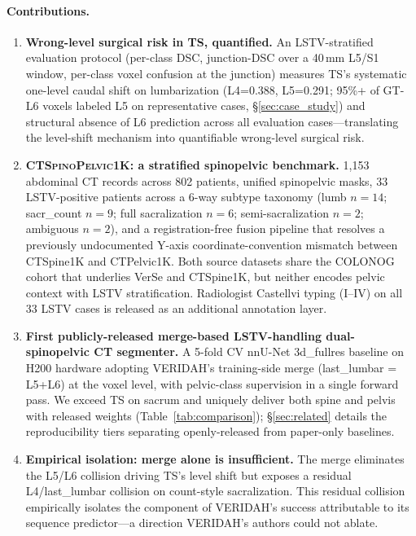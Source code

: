 \documentclass{article}
\newcommand{\dataset}{\textsc{CTSpinoPelvic1K}}
\newcommand{\sota}{TS}
\newcommand{\VERIDAH}{VERIDAH}
\newcommand{\VerSe}{VerSe}
\begin{document}
\paragraph{Contributions.}
\begin{enumerate}
\item[(i)] \textbf{Wrong-level surgical risk in \sota{},
  quantified.} An LSTV-stratified evaluation protocol
  (per-class DSC, junction-DSC over a 40\,mm L5/S1
  window, per-class voxel confusion at the junction)
  measures \sota{}'s systematic one-level caudal shift
  on lumbarization (L4=0.388, L5=0.291; 95\%+ of GT-L6
  voxels labeled L5 on representative cases,
  \S\ref{sec:case_study}) and structural absence of L6
  prediction across all evaluation cases---translating
  the level-shift mechanism into quantifiable
  wrong-level surgical risk.
\item[(ii)] \textbf{\dataset{}: a stratified spinopelvic
  benchmark.} 1{,}153 abdominal CT records across 802
  patients, unified spinopelvic masks, 33 LSTV-positive
  patients across a 6-way subtype taxonomy
  (lumb $n=14$; sacr\_count $n=9$; full sacralization
  $n=6$; semi-sacralization $n=2$; ambiguous $n=2$), and a
  registration-free fusion pipeline that resolves a
  previously undocumented Y-axis coordinate-convention
  mismatch between CTSpine1K and CTPelvic1K. Both source
  datasets share the COLONOG cohort that underlies
  \VerSe{} and CTSpine1K, but neither encodes pelvic
  context with LSTV stratification. Radiologist
  Castellvi typing (I--IV) on all 33 LSTV cases is
  released as an additional annotation layer.
\item[(iii)] \textbf{First publicly-released merge-based
  LSTV-handling dual-spinopelvic CT segmenter.} A 5-fold CV nnU-Net
  3d\_fullres baseline on H200 hardware adopting
  \VERIDAH{}'s training-side merge
  (last\_lumbar = L5+L6) at the voxel level, with
  pelvic-class supervision in a single forward pass.
  We exceed \sota{} on sacrum and uniquely deliver both
  spine and pelvis with released weights
  (Table~\ref{tab:comparison}); \S\ref{sec:related}
  details the reproducibility tiers separating
  openly-released from paper-only baselines.
\item[(iv)] \textbf{Empirical isolation: merge alone is
  insufficient.} The merge eliminates the L5/L6
  collision driving \sota{}'s level shift but exposes a
  residual L4/last\_lumbar collision on count-style
  sacralization. This residual collision empirically
  isolates the component of \VERIDAH{}'s success
  attributable to its sequence predictor---a direction
  \VERIDAH{}'s authors could not ablate.
\end{enumerate}
\end{document}
